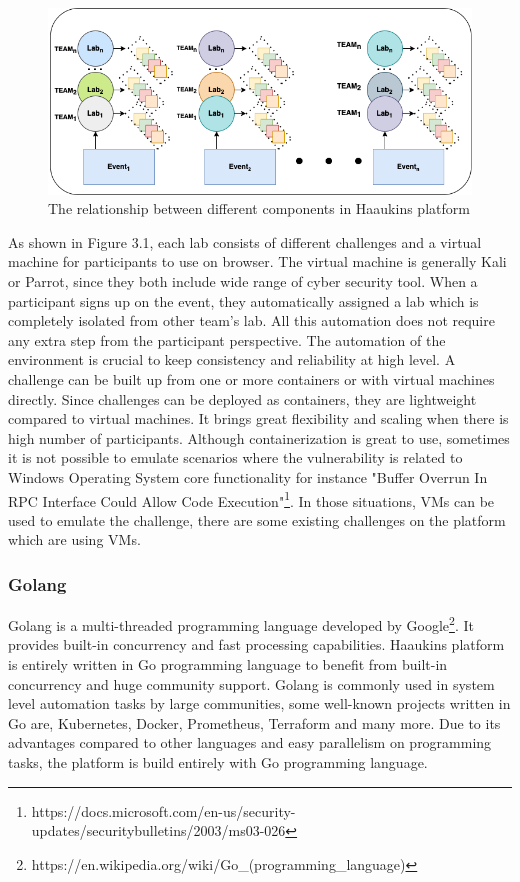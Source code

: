 \begin{figure}[htbp]
\centerline{\includegraphics[scale=.5]{figures/relationship-diagram.png}}
\caption{The relationship between different components in Haaukins platform}
\label{fig}
\end{figure}
 
As shown in Figure 3.1, each lab consists of different challenges and a virtual machine for participants to use on browser\cite{9453985}. The virtual machine is generally Kali or Parrot, since they both include wide range of cyber security tool. When a participant signs up on the event, they automatically assigned a lab which is completely isolated from other team's lab. All this automation does not require any extra step from the participant perspective. The automation of the environment is crucial to keep consistency and reliability at high level.   
A challenge can be built up from one or more containers or with virtual machines directly. Since challenges can be deployed as containers, they are lightweight compared to virtual machines. It brings great flexibility and scaling when there is high number of participants. Although containerization is great to use, sometimes it is not possible to emulate scenarios where the vulnerability is related to Windows Operating System core functionality for instance "Buffer Overrun In RPC Interface Could Allow Code Execution"\footnote{https://docs.microsoft.com/en-us/security-updates/securitybulletins/2003/ms03-026}. In those situations, VMs can be used to emulate the challenge, there are some existing challenges on the platform which are using VMs. 


\subsubsection{Golang}

Golang is a multi-threaded programming language developed by Google\footnote{https://en.wikipedia.org/wiki/Go_(programming_language)}. It provides built-in concurrency and fast processing capabilities. Haaukins platform is entirely written in Go programming language to benefit from built-in concurrency and huge community support. 
Golang is commonly used in system level automation tasks by large communities, some well-known projects written in Go are, Kubernetes, Docker, Prometheus, Terraform and many more. 
Due to its advantages compared to other languages and easy parallelism on programming tasks, the platform is build entirely with Go programming language. 

